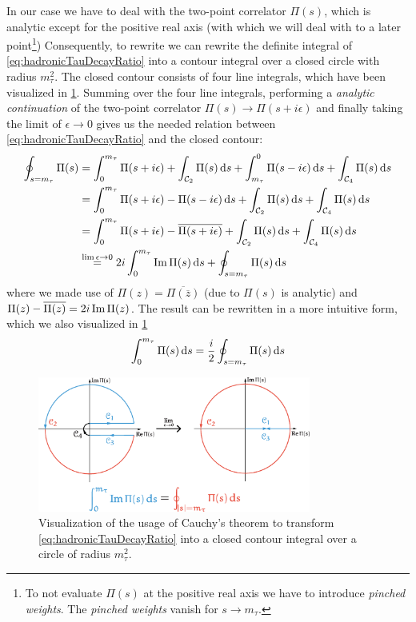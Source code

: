 \documentclass[../../index.tex]{subfiles}
\begin{document}
In our case we have to deal with the two-point correlator $\Pi(s)$, which is analytic
except for the positive real axis (with which we will deal with to a later
point\footnote{To not evaluate $\Pi(s)$ at the positive real axis we have to
  introduce \textit{pinched weights}. The \textit{pinched weights} vanish for $s
  \to m_\tau$.}) Consequently, to rewrite we can rewrite the definite integral of
\cref{eq:hadronicTauDecayRatio} into a contour integral over a closed circle
with
radius $m_\tau^2$. The closed contour consists of four line integrals,
which have been visualized in \cref{fig:rTauCauchysTheorem}. Summing over the
four line integrals, performing a \textit{analytic continuation} of the
two-point correlator $\Pi(s) \to \Pi(s + i \epsilon)$ and finally taking the
limit of $\epsilon \to 0$ gives us the needed relation between
\cref{eq:hadronicTauDecayRatio} and the closed contour:
\begin{equation}
  \begin{split}
  \oint_{s=m_\tau} \Pi(s) &= \int_0^{m_\tau} \Pi(s + i \epsilon) + \int_{\mathcal{C}_2}\Pi(s) \dif s + \int_{m_\tau}^0 \Pi(s - i \epsilon) \dif s + \int_{\mathcal{C}_4} \Pi(s) \dif s \\
  &= \int_0^{m_\tau} \Pi(s+i \epsilon) - \Pi(s - i \epsilon) \dif s  + \int_{\mathcal{C}_2}\Pi(s) \dif s + \int_{\mathcal{C}_4} \Pi(s) \dif s \\
  &= \int_0^{m_\tau} \Pi(s + i \epsilon) - \overline{\Pi(s + i \epsilon)} + \int_{\mathcal{C}_2}\Pi(s) \dif s + \int_{\mathcal{C}_4} \Pi(s) \dif s \\
  &\overset{\lim \epsilon \to 0}{=} 2 i \int_0^{m_\tau} \Ima \Pi(s) \dif s + \oint_{s=m_\tau} \Pi(s) \dif s
  \end{split}
\end{equation}
where we made use of $\Pi(z) = \overline{\Pi(\overline z)}$ (due to $\Pi(s)$ is analytic) and
$\Pi(z) - \overline{\Pi(z)} = 2 i \operatorname{Im} \Pi(z)$. The result can be rewritten in a
more intuitive form, which we also visualized in \cref{fig:rTauCauchysTheorem}
\begin{equation}
  \label{eq:correlatorContourIntegral}
  \int_0^{m_\tau} \Pi(s) \dif s = \frac{i}{2} \oint_{s=m_\tau} \Pi(s) \dif s
\end{equation}
\begin{figure}
  \centering
  \includegraphics[width=0.8\textwidth]{./images/rTauCauchysTheorem.eps}
  \caption{Visualization of the usage of Cauchy's theorem to transform
    \cref{eq:hadronicTauDecayRatio} into a closed contour integral over a circle
  of radius $m_\tau^2$.}
  \label{fig:rTauCauchysTheorem}
\end{figure}
\end{document}
